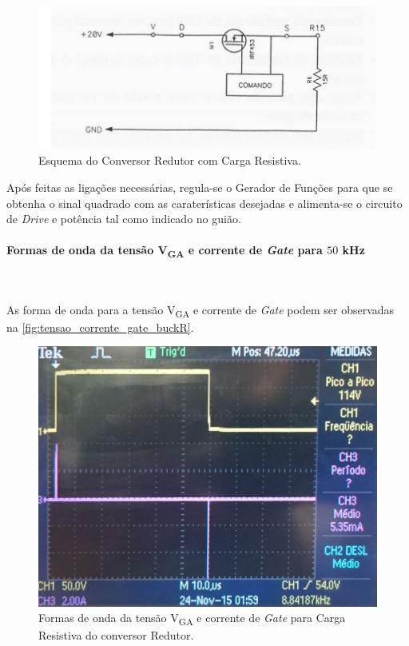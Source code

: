 \documentclass[a4paper,11pt]{article}
\numberwithin{equation}{section}
\begin{document}
\begin{figure}[h]
	\centering
	\includegraphics[keepaspectratio=true, scale=0.8]{teoricas/Redutor_R}
	\caption{Esquema do Conversor Redutor com Carga Resistiva.}
	\label{fig:Red R}
	\vspace{-0.8em}
\end{figure}

	Após feitas as ligações necessárias, regula-se o Gerador de Funções para que se obtenha o sinal quadrado com as caraterísticas desejadas e alimenta-se o circuito de \textit{Drive} e potência tal como indicado no guião.
	
\paragraph{Formas de onda da tensão V\textsubscript{GA} e corrente de \textit{Gate} para $50$ kHz}\mbox{}\

As forma de onda para a tensão V\textsubscript{GA} e corrente de \textit{Gate} podem ser observadas na \autoref{fig:tensao_corrente_gate_buckR}.

\begin{figure}[h]
	\centering
	\includegraphics[keepaspectratio=true, scale=0.13]{img/figs/tensao_corrente_gate_buckR}
	\caption{Formas de onda da tensão V\textsubscript{GA} e corrente de \textit{Gate} para Carga Resistiva do conversor Redutor.}
	\label{fig:tensao_corrente_gate_buckR}
	\vspace{-0.8em}
\end{figure} 
\end{document}
